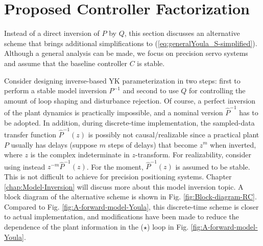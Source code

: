 \documentclass [11pt, proquest] {uwthesis}[2020/02/24]
\begin{document}
\section{Proposed Controller Factorization} \label{sec:Proposed0-controller-factorization}

\label{sec:Instead-of-a}Instead of a direct inversion of $P$ by
$Q$, this section discusses an alternative scheme that brings additional
simplifications to (\ref{eq:generalYoula_S-simplified}). Although
a general analysis can be made, we focus on precision servo systems
and assume that the baseline controller $C$ is stable. 

Consider designing inverse-based YK parameterization in two steps:
first to perform a stable model inversion $P^{-1}$ and second to
use $Q$ for controlling the amount of loop shaping and disturbance
rejection. Of course, a perfect inversion of the plant dynamics is
practically impossible, and a nominal version $\hat{P}^{-1}$ has
to be adopted. In addition, during discrete-time implementation, the
sampled-data transfer function $\hat{P}^{-1}(z)$ is possibly not
causal/realizable since a practical plant $P$ usually has delays
(suppose $m$ steps of delays) that become $z^{m}$ when inverted, where $z$ is the complex indeterminate in $z$-transform.
For realizability, consider using instead $z^{-m}\hat{P}^{-1}(z)$.
For the moment, $\hat{P}^{-1}(z)$ is assumed to be stable. This is
not difficult to achieve for precision positioning systems. Chapter \ref{chap:Model-Inversion} will discuss more about this model inversion topic. A block
diagram of the alternative scheme is shown in Fig. \ref{fig:Block-diagram-RC}.
Compared to Fig. \ref{fig:A-forward-model-Youla}, this discrete-time
scheme is closer to actual implementation, and modifications have
been made to reduce the dependence of the plant information in the
($\star$) loop in Fig. \ref{fig:A-forward-model-Youla}. 
\end{document}
